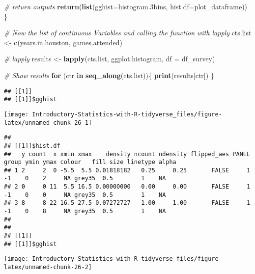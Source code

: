 \documentclass[
]{book}
\newenvironment{Shaded}{\begin{snugshade}}{\end{snugshade}}
\newcommand{\CommentTok}[1]{\textcolor[rgb]{0.56,0.35,0.01}{\textit{#1}}}
\newcommand{\ControlFlowTok}[1]{\textcolor[rgb]{0.13,0.29,0.53}{\textbf{#1}}}
\newcommand{\DataTypeTok}[1]{\textcolor[rgb]{0.13,0.29,0.53}{#1}}
\newcommand{\FloatTok}[1]{\textcolor[rgb]{0.00,0.00,0.81}{#1}}
\newcommand{\KeywordTok}[1]{\textcolor[rgb]{0.13,0.29,0.53}{\textbf{#1}}}
\newcommand{\NormalTok}[1]{#1}
\newcommand{\StringTok}[1]{\textcolor[rgb]{0.31,0.60,0.02}{#1}}
\begin{document}
\begin{Shaded}
\begin{Highlighting}[]
    \CommentTok{\# return outputs}
    \KeywordTok{return}\NormalTok{(}\KeywordTok{list}\NormalTok{(}\DataTypeTok{gghist=}\NormalTok{histogram}\FloatTok{.3}\NormalTok{bins, }\DataTypeTok{hist.df=}\NormalTok{plot\_dataframe))}
\NormalTok{\}}
\end{Highlighting}
\end{Shaded}

\begin{Shaded}
\begin{Highlighting}[]
\CommentTok{\# Now the list of continuous Variables and calling the function with lapply}
\NormalTok{cts.list \textless{}{-}}\StringTok{ }\KeywordTok{c}\NormalTok{(}\StringTok{\textquotesingle{}years.in.houston\textquotesingle{}}\NormalTok{, }\StringTok{\textquotesingle{}games.attended\textquotesingle{}}\NormalTok{)}

\CommentTok{\# lapply}
\NormalTok{results \textless{}{-}}\StringTok{ }\KeywordTok{lapply}\NormalTok{(cts.list,}
\NormalTok{       ggplot.histogram,}
       \DataTypeTok{df =}\NormalTok{ df\_survey)}

\CommentTok{\# Show results}
\ControlFlowTok{for}\NormalTok{ (ctr }\ControlFlowTok{in} \KeywordTok{seq\_along}\NormalTok{(cts.list))\{}
    \KeywordTok{print}\NormalTok{(results[ctr])}
\NormalTok{\}}
\end{Highlighting}
\end{Shaded}

\begin{verbatim}
## [[1]]
## [[1]]$gghist
\end{verbatim}

\begin{center}\texttt{[image: Introductory-Statistics-with-R-tidyverse\_files/figure-latex/unnamed-chunk-26-1]} \end{center}

\begin{verbatim}
## 
## [[1]]$hist.df
##   y count  x xmin xmax    density ncount ndensity flipped_aes PANEL group ymin ymax colour   fill size linetype alpha
## 1 2     2  0 -5.5  5.5 0.01818182   0.25     0.25       FALSE     1    -1    0    2     NA grey35  0.5        1    NA
## 2 0     0 11  5.5 16.5 0.00000000   0.00     0.00       FALSE     1    -1    0    0     NA grey35  0.5        1    NA
## 3 8     8 22 16.5 27.5 0.07272727   1.00     1.00       FALSE     1    -1    0    8     NA grey35  0.5        1    NA
## 
## 
## [[1]]
## [[1]]$gghist
\end{verbatim}

\begin{center}\texttt{[image: Introductory-Statistics-with-R-tidyverse\_files/figure-latex/unnamed-chunk-26-2]} \end{center}
\end{document}
